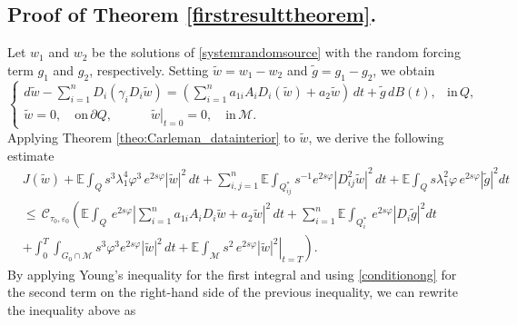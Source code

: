 \documentclass[11pt,oneside,leqno]{amsart}
\numberwithin{equation}{section}
\numberwithin{equation}{section}
\newcommand{\E}{\mathbb{E}}
\begin{document}
\subsection{Proof of Theorem \ref{firstresulttheorem}.}\label{Proof:firstresult}

Let $w_{1}$ and $w_{2}$ be the solutions of \eqref{systemrandomsource} with the random forcing term $g_{1}$ and $g_{2}$, respectively. Setting $\tilde{w}=w_{1}-w_{2}$ and $\tilde{g}=g_{1}-g_{2}$, we obtain
\begin{equation*}
    \begin{cases}
     d\tilde{w}-\sum_{i=1}^{n}D_i(\gamma_{i}D_i\tilde{w})=\left({ \sum_{i=1}^{n}}a_{1i}A_iD_i(\tilde{w})+a_2\tilde{w}\right)\,dt+\tilde{g}\,dB(t),    &\text{in}\,Q,  \\
 \tilde{w}=0,\quad\text{on}\, \partial Q,\quad\quad\quad\left.\tilde{w}\right|_{t=0}=0,\quad \text{in}\,\mathcal{M}.
    \end{cases}
\end{equation*}
Applying Theorem \ref{theo:Carleman_datainterior} to $\tilde{w}$,  we derive the following estimate
{ 
\begin{equation*}
\begin{split}
&J(\tilde{w})+\E\int_{Q}s^{3}\lambda^{4}_{1}\varphi^{3}\,e^{2s\varphi}|\tilde{w}|^{2}\,dt+\sum_{i,j=1}^{n}\E\int_{Q_{ij}^{\ast}}s^{-1}e^{2s\varphi}|D_{ij}^2\tilde{w}|^2\, dt+\E\int_{Q}s\lambda_{1}^2\varphi\,e^{2s\varphi}|\tilde{g}|^2dt\\
&\leq\,\mathcal{C}_{\tau_{0},\varepsilon_0}\left(\E\int_{Q}\,e^{2s\varphi}\left|\sum_{i=1}^{n}a_{1i}A_iD_i\tilde{w}+a_2\tilde{w}\right|^2\,dt+\sum_{i=1}^{n}\E\int_{Q_i^{\ast}}\,e^{2s\varphi}|D_i\tilde{g}|^2dt\right.\\
&\left.+\int_{0}^T\int_{G_0\cap\mathcal{M}}s^3\varphi^3e^{2s\varphi}|\tilde{w}|^2\,dt+\left.\E\int_{\mathcal{M}}s^2\,e^{2s\varphi}|\tilde{w}|^2\right|_{t=T}\right).
\end{split}
\end{equation*}
}
By applying Young's inequality for the first integral and using \eqref{conditionong} for the second term on the right-hand side of the previous inequality, we can rewrite the inequality above as
\end{document}
